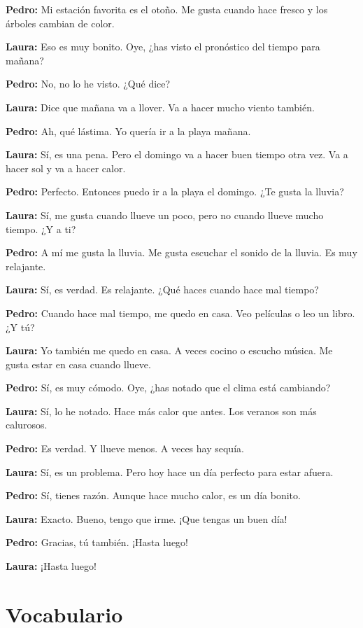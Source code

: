 \documentclass[12pt,a4paper]{article}
\begin{document}
\textbf{Pedro:} Mi estación favorita es el otoño. Me gusta cuando hace fresco y los árboles cambian de color.

\textbf{Laura:} Eso es muy bonito. Oye, ¿has visto el pronóstico del tiempo para mañana?

\textbf{Pedro:} No, no lo he visto. ¿Qué dice?

\textbf{Laura:} Dice que mañana va a llover. Va a hacer mucho viento también.

\textbf{Pedro:} Ah, qué lástima. Yo quería ir a la playa mañana.

\textbf{Laura:} Sí, es una pena. Pero el domingo va a hacer buen tiempo otra vez. Va a hacer sol y va a hacer calor.

\textbf{Pedro:} Perfecto. Entonces puedo ir a la playa el domingo. ¿Te gusta la lluvia?

\textbf{Laura:} Sí, me gusta cuando llueve un poco, pero no cuando llueve mucho tiempo. ¿Y a ti?

\textbf{Pedro:} A mí me gusta la lluvia. Me gusta escuchar el sonido de la lluvia. Es muy relajante.

\textbf{Laura:} Sí, es verdad. Es relajante. ¿Qué haces cuando hace mal tiempo?

\textbf{Pedro:} Cuando hace mal tiempo, me quedo en casa. Veo películas o leo un libro. ¿Y tú?

\textbf{Laura:} Yo también me quedo en casa. A veces cocino o escucho música. Me gusta estar en casa cuando llueve.

\textbf{Pedro:} Sí, es muy cómodo. Oye, ¿has notado que el clima está cambiando?

\textbf{Laura:} Sí, lo he notado. Hace más calor que antes. Los veranos son más calurosos.

\textbf{Pedro:} Es verdad. Y llueve menos. A veces hay sequía.

\textbf{Laura:} Sí, es un problema. Pero hoy hace un día perfecto para estar afuera.

\textbf{Pedro:} Sí, tienes razón. Aunque hace mucho calor, es un día bonito.

\textbf{Laura:} Exacto. Bueno, tengo que irme. ¡Que tengas un buen día!

\textbf{Pedro:} Gracias, tú también. ¡Hasta luego!

\textbf{Laura:} ¡Hasta luego!

\newpage

\section*{Vocabulario}
\end{document}
